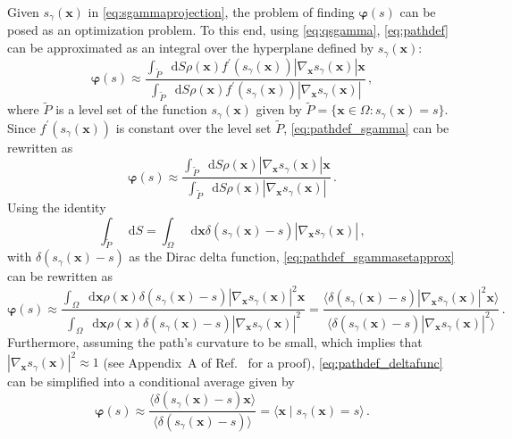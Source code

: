 \documentclass{article}
\numberwithin{equation}{section}
\def\*#1{\mathbf{#1}}
\newcommand*\diff{\mathop{}\!\mathrm{d}}
\theoremstyle{definition}
\theoremstyle{remark}
\def\varphib{\boldsymbol{\varphi}}
\begin{document}
Given $s_\gamma(\* x)$ in \cref{eq:sgammaprojection}, the problem of finding $\varphib(s)$ can be posed as an optimization problem. 
To this end, using \cref{eq:qsgamma}, 
\cref{eq:pathdef} can be approximated as an integral over the hyperplane defined by $s_\gamma(\* x)$:
\begin{equation}
    \varphib(s) \approx \frac{\int_{\tilde{P}} \diff S \rho(\* x)f^\prime(s_\gamma(\* x))|\nabla_{\* x} s_\gamma(\* x)| \* x}{\int_{\tilde{P}} \diff S  \rho(\* x) f^\prime(s_\gamma(\* x))|\nabla_{\* x} s_\gamma(\* x)| } \,, \label{eq:pathdef_sgamma}
\end{equation}
where $\tilde{P}$ is a level set of the function $s_\gamma(\* x)$ given by $\tilde{P}= \{ \* x \in \Omega : s_\gamma(\* x)= s \}$.
Since $f^\prime(s_\gamma(\* x)) $ is constant over the level set $\tilde{P}$, \cref{eq:pathdef_sgamma} can be rewritten as 
\begin{equation}
\varphib(s) \approx \frac{\int_{\tilde{P}} \diff S \rho(\* x) |\nabla_{\* x} s_\gamma(\* x)| \* x}{\int_{\tilde{P}} \diff S \rho(\* x) |\nabla_{\* x} s_\gamma(\* x)| } \,. \label{eq:pathdef_sgammasetapprox} 
\end{equation} 
Using the identity \cite{Osher2003}
\begin{equation}
\int_{\tilde{P}} \diff S = \int_\Omega \diff \* x \delta(s_\gamma(\* x)-s) |\nabla_{\* x} s_\gamma(\* x)| \,,
\end{equation}
with $\delta(s_\gamma(\* x)-s)$ as the Dirac delta function, \cref{eq:pathdef_sgammasetapprox} can be rewritten as  
\begin{equation}
\varphib(s) \approx \frac{\int_\Omega \diff \* x \rho(\* x) \delta(s_\gamma(\* x)-s) |\nabla_{\* x} s_\gamma(\* x)|^2 \* x}{\int_\Omega \diff \* x \rho(\* x) \delta(s_\gamma(\* x)-s) |\nabla_{\* x} s_\gamma(\* x)|^2} = \frac{\langle \delta(s_\gamma(\* x)-s) |\nabla_{\* x} s_\gamma(\* x)|^2  \* x \rangle }{\langle \delta(s_\gamma(\* x)-s) |\nabla_{\* x} s_\gamma(\* x)|^2  \rangle} \label{eq:pathdef_deltafunc} \,. 
\end{equation}
Furthermore, assuming the path's curvature to be small, which implies that $|\nabla_{\* x} s_\gamma(\* x)|^2 \approx 1$ (see Appendix~A of Ref.~\cite{vanden2009revisiting} for a proof), \cref{eq:pathdef_deltafunc} can be simplified into a conditional average given by
\begin{equation}
\varphib(s) \approx \frac{\langle \delta(s_\gamma(\* x)-s) \* x \rangle }{\langle \delta(s_\gamma(\* x)-s) \rangle} = \langle \* x \mid s_\gamma(\* x) = s \rangle \label{eq:princcurve} \,.
\end{equation}
\end{document}
